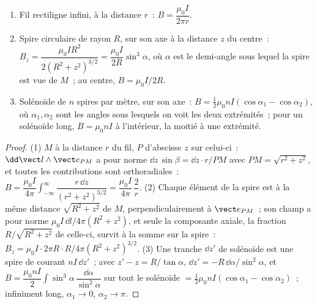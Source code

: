 \begin{proposition}\label{prop:b1:magnetostatics:three}
\begin{enumerate}
  \item Fil rectiligne infini, à la distance $r$~: $B = \dfrac{\mu_0I}{2\pi r}$.
  \item Spire circulaire de rayon $R$, sur son axe à la distance $z$ du
        centre~: $B_z = \dfrac{\mu_0IR^2}{2(R^2 + z^2)^{3/2}} = \dfrac{\mu_0I}{2R}
        \sin^3\alpha$, où $\alpha$ est le demi-angle sous lequel la spire est
        vue de $M$~; au centre, $B = \mu_0I/2R$.
  \item Solénoïde de $n$ spires par mètre, sur son axe~: $B = \tfrac12\mu_0nI
        (\cos\alpha_1 - \cos\alpha_2)$, où $\alpha_1, \alpha_2$ sont les angles sous
        lesquels on voit les deux extrémités~; pour un solénoïde long, $B = \mu_0nI$
        à l'intérieur, la moitié à une extrémité.
\end{enumerate}
\end{proposition}

\begin{proof}
(1) $M$ à la distance $r$ du fil, $P$ d'abscisse $z$ sur celui-ci~:
$\dd\vect l\wedge\vect e_{PM}$ a pour norme $\dd z\,\sin\beta = \dd z\cdot r/PM$
avec $PM = \sqrt{r^2 + z^2}$, et toutes les contributions sont orthoradiales~:
$B = \dfrac{\mu_0I}{4\pi}\displaystyle\int_{-\infty}^{\infty}\dfrac{r\,\dd z}{(r^2 + z^2)^{3/2}}
= \dfrac{\mu_0I}{4\pi}\,\dfrac{2}{r}$. (2) Chaque élément de la spire est à
la même distance $\sqrt{R^2 + z^2}$ de $M$, perpendiculairement à
$\vect e_{PM}$~; son champ a pour norme $\mu_0I\,\dd l/4\pi(R^2 + z^2)$, et
seule la composante axiale, la fraction $R/\sqrt{R^2 + z^2}$ de celle-ci,
survit à la somme sur la spire~: $B_z = \mu_0I\cdot2\pi R\cdot R/4\pi(R^2 +
z^2)^{3/2}$. (3) Une tranche $\dd z'$ de solénoïde est une spire de courant
$nI\,\dd z'$~; avec $z' - z = R/\tan\alpha$, $\dd z' = -R\,\dd\alpha/\sin^2\alpha$,
et $B = \dfrac{\mu_0nI}{2}\displaystyle\int\sin^3\alpha\,\dfrac{\dd\alpha}{\sin^2\alpha}$ sur
tout le solénoïde $= \tfrac12\mu_0nI(\cos\alpha_1 - \cos\alpha_2)$~; infiniment
long, $\alpha_1 \to 0$, $\alpha_2 \to \pi$.
\end{proof}

